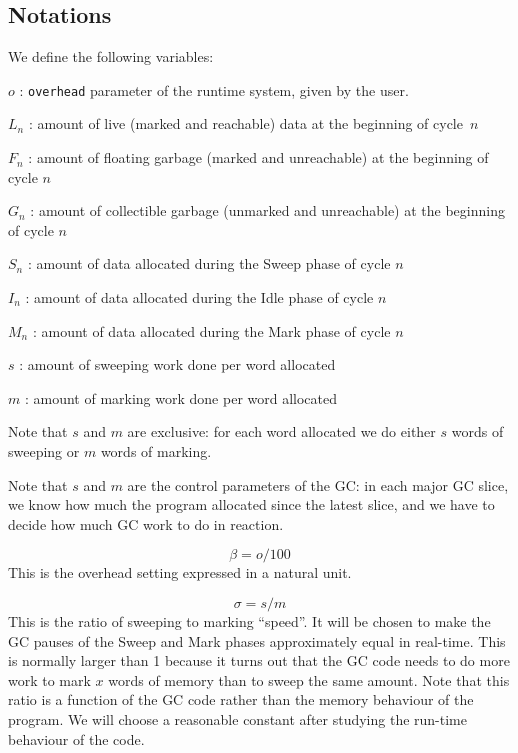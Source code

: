 \documentclass{article}
\begin{document}
\subsection{Notations}

We define the following variables:

\bigskip
$o$ : \verb'overhead' parameter of the runtime system, given by
the user.

$L_n$ : amount of live (marked and reachable) data at the
beginning of cycle~$n$

$F_n$ : amount of floating garbage (marked and unreachable) at
the beginning of cycle $n$

$G_n$ : amount of collectible garbage (unmarked and unreachable)
at the beginning of cycle $n$

$S_n$ : amount of data allocated during the Sweep phase of cycle
$n$

$I_n$ : amount of data allocated during the Idle phase of cycle
$n$

$M_n$ : amount of data allocated during the Mark phase of cycle
$n$

$s$ : amount of sweeping work done per word allocated

$m$ : amount of marking work done per word allocated

Note that $s$ and $m$ are exclusive: for each word allocated we do
either $s$ words of sweeping or $m$ words of marking.

\bigskip

Note that $s$ and $m$ are the control parameters of the GC: in each
major GC slice, we know how much the program allocated since the
latest slice, and we have to decide how much GC work to do in
reaction.

\bigskip

\begin{equation}\label{def-beta}
\beta = o/100
\end{equation}
This is the overhead setting expressed in a natural unit.

\begin{equation}\label{def-sigma}
\sigma = s/m
\end{equation}
This is the ratio of sweeping to marking ``speed''. It
will be chosen to make the GC pauses of the Sweep and Mark phases
approximately equal in real-time. This is normally larger than 1
because it turns out that the GC code needs to do more work to mark
$x$ words of memory than to sweep the same amount. Note that this
ratio is a function of the GC code rather than the memory behaviour of
the program. We will choose a reasonable constant after studying the
run-time behaviour of the code.
\end{document}
